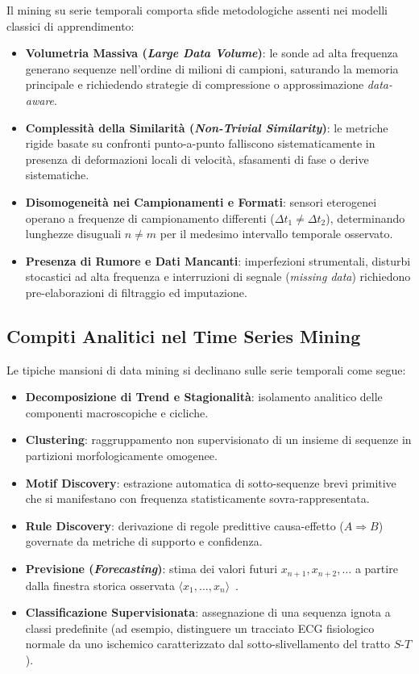 Il mining su serie temporali comporta sfide metodologiche assenti nei modelli classici di apprendimento:
\begin{itemize}
    \item \textbf{Volumetria Massiva (\textit{Large Data Volume})}: le sonde ad alta frequenza generano sequenze nell'ordine di milioni di campioni, saturando la memoria principale e richiedendo strategie di compressione o approssimazione \textit{data-aware}.
    \item \textbf{Complessit\`a della Similarit\`a (\textit{Non-Trivial Similarity})}: le metriche rigide basate su confronti punto-a-punto falliscono sistematicamente in presenza di deformazioni locali di velocit\`a, sfasamenti di fase o derive sistematiche.
    \item \textbf{Disomogeneit\`a nei Campionamenti e Formati}: sensori eterogenei operano a frequenze di campionamento differenti ($\Delta t_1 \neq \Delta t_2$), determinando lunghezze disuguali $n \neq m$ per il medesimo intervallo temporale osservato.
    \item \textbf{Presenza di Rumore e Dati Mancanti}: imperfezioni strumentali, disturbi stocastici ad alta frequenza e interruzioni di segnale (\textit{missing data}) richiedono pre-elaborazioni di filtraggio ed imputazione.
\end{itemize}

\FloatBarrier
\subsection{Compiti Analitici nel Time Series Mining}
\label{subsec:ts-analytical-tasks}

Le tipiche mansioni di data mining si declinano sulle serie temporali come segue:
\begin{itemize}
    \item \textbf{Decomposizione di Trend e Stagionalit\`a}: isolamento analitico delle componenti macroscopiche e cicliche.
    \item \textbf{Clustering}: raggruppamento non supervisionato di un insieme di sequenze in partizioni morfologicamente omogenee.
    \item \textbf{Motif Discovery}: estrazione automatica di sotto-sequenze brevi primitive che si manifestano con frequenza statisticamente sovra-rappresentata.
    \item \textbf{Rule Discovery}: derivazione di regole predittive causa-effetto ($A \Rightarrow B$) governate da metriche di supporto e confidenza.
    \item \textbf{Previsione (\textit{Forecasting})}: stima dei valori futuri $x_{n+1}, x_{n+2}, \dots$ a partire dalla finestra storica osservata $\langle x_1, \dots, x_n \rangle$~\cite{hyndman2018}.
    \item \textbf{Classificazione Supervisionata}: assegnazione di una sequenza ignota a classi predefinite (ad esempio, distinguere un tracciato ECG fisiologico normale da uno ischemico caratterizzato dal sotto-slivellamento del tratto $S$-$T$).
\end{itemize}

